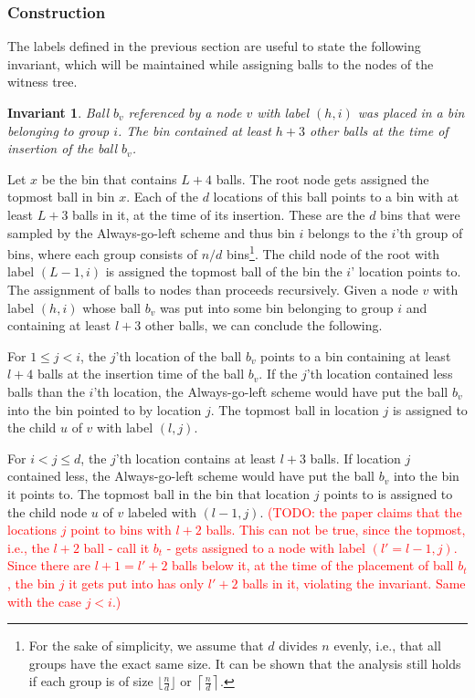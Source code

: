 \documentclass[a4paper,12pt]{article}
\newcommand\todo[1]{\textcolor{red}{(TODO: #1)}}
\newtheorem{invariant}{Invariant}
\begin{document}
\subsubsection{Construction}
\label{sec:analysis:constructionAsymWT}
The labels defined in the previous section are useful to state the following invariant, which will be maintained while assigning balls to the nodes of the witness tree.

\begin{invariant}
Ball $b_v$ referenced by a node $v$ with label $(h,i)$ was placed in a bin belonging to group $i$. The bin contained at least $h+3$ other balls at the time of insertion of the ball $b_v$.
\end{invariant}

Let $x$ be the bin that contains $L+4$ balls. The root node gets assigned the topmost ball in bin $x$. Each of the $d$ locations of this ball points to a bin with at least $L+3$ balls in it, at the time of its insertion. These are the $d$ bins that were sampled by the Always-go-left scheme and thus bin $i$ belongs to the $i$'th group of bins, where each group consists of $n/d$ bins\footnote{For the sake of simplicity, we assume that $d$ divides $n$ evenly, i.e., that all groups have the exact same size. It can be shown that the analysis still holds if each group is of size $\lfloor\frac{n}{d}\rfloor$ or $\left\lceil\frac{n}{d}\right\rceil$.}. The child node of the root with label $(L-1, i)$ is assigned the topmost ball of the bin the $i$' location points to. The assignment of balls to nodes than proceeds recursively. Given a node $v$ with label $(h, i)$ whose ball $b_v$ was put into some bin belonging to group $i$ and containing at least $l+3$ other balls, we can conclude the following.
\begin{compactitem}
\item For $1\leq j < i$, the $j$'th location of the ball $b_v$ points to a bin containing at least $l+4$ balls at the insertion time of the ball $b_v$. If the $j$'th location contained less balls than the $i$'th location, the Always-go-left scheme would have put the ball $b_v$ into the bin pointed to by location $j$. The topmost ball in location $j$ is assigned to the  child $u$ of $v$ with label $(l,j)$. 
\item For $i < j \leq d$, the $j$'th location contains at least $l+3$ balls. If location $j$ contained less, the Always-go-left scheme would have put the ball $b_v$ into the bin it points to. The topmost ball in the bin that location $j$ points to is assigned to the child node $u$ of $v$ labeled with $(l-1, j)$. \todo{the paper claims that the locations $j$ point to bins with $l+2$ balls. This can not be true, since the topmost, i.e., the $l+2$ ball - call it $b_t$ - gets assigned to a node with label $(l'=l-1, j)$. Since there are $l+1=l'+2$ balls below it, at the time of the placement of ball $b_t$, the bin $j$ it gets put into has only $l'+2$ balls in it, violating the invariant. Same with the case $j<i$.} 
\end{compactitem}
\end{document}
